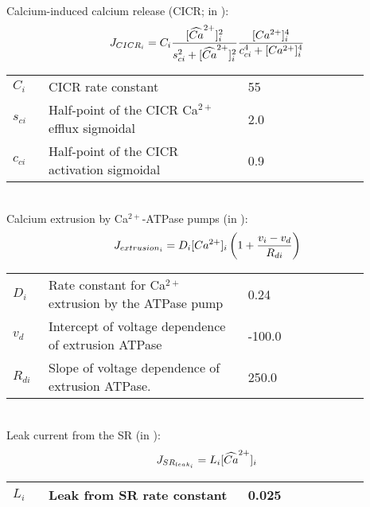 \documentclass[fleqn]{report}
\numberwithin{equation}{section}
\numberwithin{equation}{section}
\begin{document}
	\\
	Calcium-induced calcium release (CICR; in \uMs):
	\begin{equation} \label{eq:JCICRi}
	J_{CICR_{i}} = C_{i}\frac{[\widehat{Ca}^{2+}]_{i}^{2}}{s_{ci}^{2}+[\widehat{Ca}^{2+}]_{i}^{2}}    \frac{[Ca^{2+}]_{i}^{4}}{c_{ci}^{4}+[Ca^{2+}]_{i}^{4}}
	\end{equation}
	\begin{table}[h!]
	\centering
	\begin{tabular}{ p{0.09\linewidth}  >{\footnotesize} p{0.5\linewidth}  >{\footnotesize} p{0.27\linewidth} >{\footnotesize} p{0.03\linewidth} }
	\hline
	$C_{i}$      			& CICR rate constant									& 55 \uMs		& \cite{Koenigsberger2006} \\
	$s_{ci}$				& Half-point of the CICR Ca$^{2+}$ efflux sigmoidal			& 2.0 \uM		& \cite{Koenigsberger2006} \\
	$c_{ci}$				& Half-point of the CICR activation sigmoidal			& 0.9 \uM		& \cite{Koenigsberger2006} \\
	\hline
	\end{tabular}
	\label{tab:JCICRi}
	\end{table}
	\\
	Calcium extrusion by Ca$^{2+}$-ATPase pumps (in \uMs):
	\begin{equation} \label{eq:Jextrusioni}
	J_{extrusion_{i}} = D_{i}[Ca^{2+}]_{i}   \left( 1+ \frac{v_{i}-v_{d}}{R_{di}}\right)
	\end{equation}
	\begin{table}[h!]
	\centering
	\begin{tabular}{ p{0.09\linewidth}  >{\footnotesize} p{0.5\linewidth}  >{\footnotesize} p{0.27\linewidth} >{\footnotesize} p{0.03\linewidth} }
	\hline
	$D_{i}$      			& Rate constant for Ca$^{2+}$ extrusion by the ATPase pump		 & 0.24	\pers			& \cite{Koenigsberger2006} \\
	$v_{d}$					& Intercept of voltage dependence of extrusion ATPase			 & -100.0 \mV			& \cite{Koenigsberger2006} \\
	$R_{di}$				& Slope of voltage dependence of extrusion ATPase.				 & 250.0 \mV			& \cite{Koenigsberger2006} \\
	\hline
	\end{tabular}
	\label{tab:Jextrusioni}
	\end{table}
	\\
	Leak current from the SR (in \uMs):
	\begin{equation} \label{eq:JSRleaki}
	J_{SR_{leak_{i}}} = L_{i}[\widehat{Ca}^{2+}]_{i}
	\end{equation}
	\begin{table}[h!]
	\centering
	\begin{tabular}{ p{0.09\linewidth}  >{\footnotesize} p{0.5\linewidth}  >{\footnotesize} p{0.27\linewidth} >{\footnotesize} p{0.03\linewidth} }
	\hline
	$L_{i}$      			& Leak from SR rate constant						 & 0.025 \pers				& \cite{Koenigsberger2006} \\
	\hline
	\end{tabular}
	\label{tab:Jleaki}
	\end{table}
	\\
	
\end{document}
